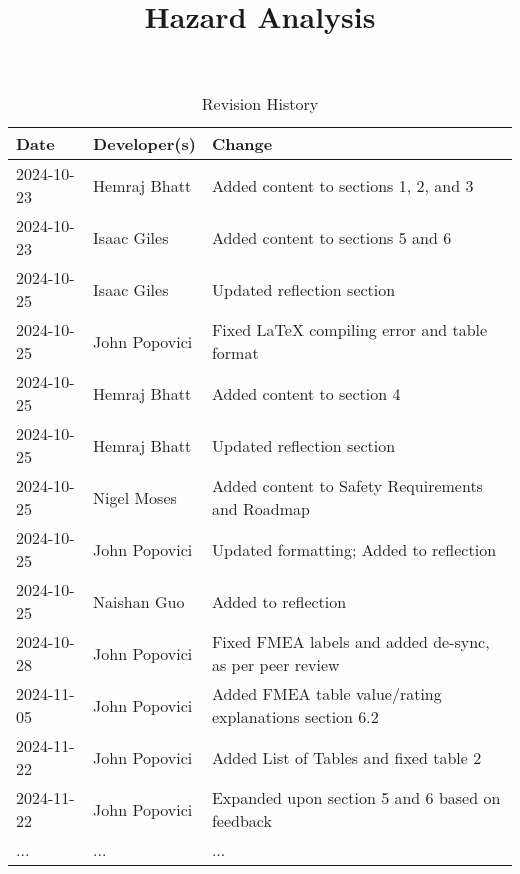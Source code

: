 \documentclass{article}
\title{Hazard Analysis\\\progname}
\author{\authname}
\date{}
\begin{document}
\maketitle
\thispagestyle{empty}



\begin{table}[hp]
\caption{Revision History} \label{TblRevisionHistory}
\begin{tabularx}{\textwidth}{llX}
\toprule
\textbf{Date} & \textbf{Developer(s)} & \textbf{Change}\\
\midrule
2024-10-23 & Hemraj Bhatt & Added content to sections 1, 2, and 3\\
2024-10-23 & Isaac Giles & Added content to sections 5 and 6 \\
2024-10-25 & Isaac Giles & Updated reflection section \\
2024-10-25 & John Popovici & Fixed LaTeX compiling error and table format \\
2024-10-25 & Hemraj Bhatt & Added content to section 4\\
2024-10-25 & Hemraj Bhatt & Updated reflection section\\
2024-10-25 & Nigel Moses & Added content to Safety Requirements and Roadmap\\
2024-10-25 & John Popovici & Updated formatting; Added to reflection \\
2024-10-25 & Naishan Guo &  Added to reflection \\
2024-10-28 & John Popovici & Fixed FMEA labels and added de-sync, as per peer review \\
2024-11-05 & John Popovici & Added FMEA table value/rating explanations section 6.2\\
2024-11-22 & John Popovici & Added List of Tables and fixed table 2\\
2024-11-22 & John Popovici & Expanded upon section 5 and 6 based on feedback\\
... & ... & ...\\
\bottomrule
\end{tabularx}
\end{table}

~\newpage

\tableofcontents

\listoftables

~\newpage


\end{document}
